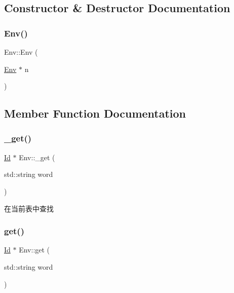 \subsection{Constructor \& Destructor Documentation}
\mbox{\label{class_env_ab9d20c5b47453e30038f156cc5e25c0f}} 
\subsubsection{\texorpdfstring{Env()}{Env()}}
{\footnotesize\ttfamily Env\+::\+Env (\begin{DoxyParamCaption}\item[{\hyperlink{class_env}{Env} $\ast$}]{n }\end{DoxyParamCaption})}



\subsection{Member Function Documentation}
\mbox{\label{class_env_aca71253ff9d30153d0834a47cd35a351}} 
\subsubsection{\texorpdfstring{\+\_\+get()}{\_get()}}
{\footnotesize\ttfamily \hyperlink{class_id}{Id} $\ast$ Env\+::\+\_\+get (\begin{DoxyParamCaption}\item[{std\+::string}]{word }\end{DoxyParamCaption})\hspace{0.3cm}{\ttfamily [protected]}}

在当前表中查找 \mbox{\label{class_env_a59bbdcdb7af396f6fb6cbff2f828e62b}} 
\subsubsection{\texorpdfstring{get()}{get()}}
{\footnotesize\ttfamily \hyperlink{class_id}{Id} $\ast$ Env\+::get (\begin{DoxyParamCaption}\item[{std\+::string}]{word }\end{DoxyParamCaption})}

